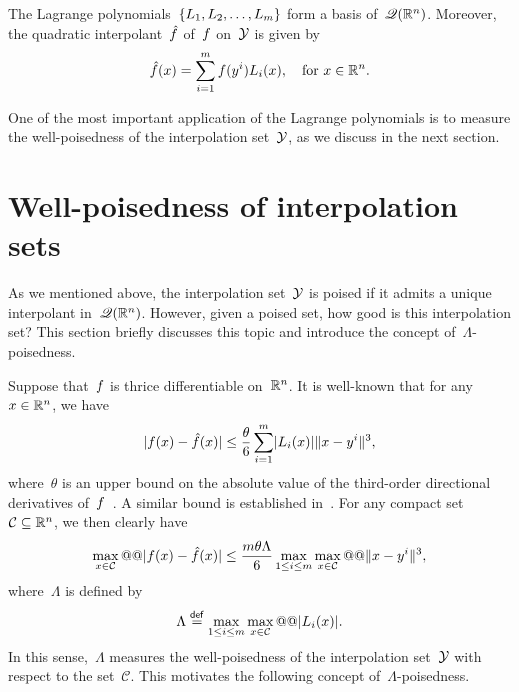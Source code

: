 \begin{theorem}
    \label{thm:lagrange-polynomials-basis}
    The Lagrange polynomials~$\set{\lagp[1], \lagp[2], \dots, \lagp[m]}$ form a basis of~$\mathscr{Q}(\mathbb{R}^n)$.
    Moreover, the quadratic interpolant~$\objm$ of~$f$ on~$\xpt$ is given by
    \begin{equation*}
        \objm(\iter) = \sum_{i = 1}^m \obj(y^i) \lagp[i](\iter), \quad \text{for~$\iter \in \R^n$}.
    \end{equation*}
\end{theorem}

One of the most important application of the Lagrange polynomials is to measure the well-poisedness of the interpolation set~$\xpt$, as we discuss in the next section.

\section{Well-poisedness of interpolation sets}
\label{sec:poisedness}

As we mentioned above, the interpolation set~$\xpt$ is poised if it admits a unique interpolant in~$\mathscr{Q}(\mathbb{R}^n)$.
However, given a poised set, how good is this interpolation set?
This section briefly discusses this topic and introduce the concept of~$\Lambda$-poisedness.

Suppose that~$f$ is thrice differentiable on~$\mathbb{R}^n$.
It is well-known that for any~$\iter \in \R^n$, we have
\begin{equation}
    \label{eq:Ciarlet_Raviart_0}
    \abs{\obj(\iter) - \objm(\iter)} \le \frac{\theta}{6} \sum_{i = 1}^m \abs{\lagp[i](\iter)} \norm{x - y^i}^3,
\end{equation}
where~$\theta$ is an upper bound on the absolute value of the third-order directional derivatives of~$f$~\cite[Thm.~2]{Powell_2001}.
A similar bound is established in~\cite[Thm.~2]{Ciarlet_Raviart_1972}.
For any compact set~$\mathcal{C} \subseteq \mathbb{R}^n$, we then clearly have
\begin{equation}
    \label{eq:ciarlet-raviard-bound}
    \max_{\iter \in \mathcal{C}} @@ \abs{\obj(\iter) - \objm(\iter)} \le \frac{m \theta \Lambda}{6} \max_{1 \le i \le m} \max_{\iter \in \mathcal{C}} @@ \norm{x - y^i}^3,
\end{equation}
where~$\Lambda$ is defined by
\begin{equation}
    \label{eq:lambda-poisedness-convex-hull}
    \Lambda \eqdef \max_{1 \le i \le m} \max_{\iter \in \mathcal{C}} @@ \abs{\lagp[i](\iter)}.
\end{equation}
In this sense,~$\Lambda$ measures the well-poisedness of the interpolation set~$\xpt$ with respect to the set~$\mathcal{C}$.
This motivates the following concept of~$\Lambda$-poisedness.

